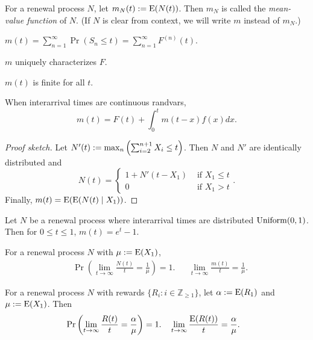 \documentclass[a4paper, 12pt, fleqn]{article}
\begin{document}
\begin{definition}
For a renewal process $N$, let $m_N(t) := \operatorname*{E}(N(t))$.
Then $m_N$ is called the \emph{mean-value function} of $N$.
(If $N$ is clear from context, we will write $m$ instead of $m_N$.)
\end{definition}

\begin{lemma}
$m(t) = \sum_{n=1}^{\infty} \Pr(S_n \le t) = \sum_{n=1}^{\infty} F^{(n)}(t)$.
\end{lemma}

\begin{theorem}
$m$ uniquely characterizes $F$.
\end{theorem}

\begin{lemma}
$m(t)$ is finite for all $t$.
\end{lemma}

\begin{theorem}
When interarrival times are continuous randvars,
\[ m(t) = F(t) + \int_0^t m(t-x)f(x)dx. \]
\end{theorem}
\begin{proof}[Proof sketch]
Let $N'(t) := \max_n \left( \sum_{i=2}^{n+1} X_i \le t \right)$.
Then $N$ and $N'$ are identically distributed and
\[ N(t) = \begin{cases} 1 + N'(t-X_1) & \textrm{ if } X_1 \le t
\\ 0 & \textrm{ if } X_1 > t \end{cases}. \]
Finally, $m(t) = \operatorname*{E}(\operatorname*{E}(N(t) \mid X_1))$.
\end{proof}

\begin{corollary}
Let $N$ be a renewal process where interarrival times are distributed $\operatorname{Uniform}(0, 1)$.
Then for $0 \le t \le 1$, $m(t) = e^t - 1$.
\end{corollary}

\begin{theorem}
For a renewal process $N$ with $\mu := \operatorname*{E}(X_1)$,
\begin{align*}
& \Pr\left(\lim_{t \to \infty} \frac{N(t)}{t} = \frac{1}{\mu}\right) = 1.
&& \lim_{t \to \infty} \frac{m(t)}{t} = \frac{1}{\mu}.
\end{align*}
\end{theorem}

\begin{theorem}
For a renewal process $N$ with rewards $\{R_i: i \in \mathbb{Z}_{\ge 1}\}$,
let $\alpha := \operatorname*{E}(R_1)$ and $\mu := \operatorname*{E}(X_1)$. Then
\begin{align*}
& \Pr\left(\lim_{t \to \infty} \frac{R(t)}{t} = \frac{\alpha}{\mu}\right) = 1.
&& \lim_{t \to \infty} \frac{\operatorname*{E}(R(t))}{t} = \frac{\alpha}{\mu}.
\end{align*}
\end{theorem}
\end{document}

